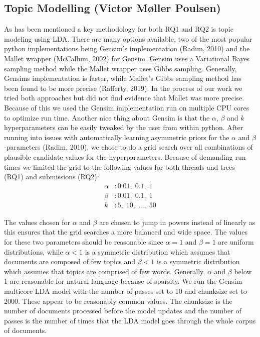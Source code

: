 \documentclass{article}
\begin{document}
    \subsection{Topic Modelling (Victor Møller Poulsen)}
    As has been mentioned a key methodology for both RQ1 and RQ2 is topic modeling using LDA. There are many options available, two of the most popular python implementations being Gensim’s implementation (Radim, 2010) and the Mallet wrapper (McCallum, 2002) for Gensim. Gensim uses a Variational Bayes sampling method while the Mallet wrapper uses Gibbs sampling. Generally, Gensims implementation is faster, while Mallet’s Gibbs sampling method has been found to be more precise (Rafferty, 2019). In the process of our work we tried both approaches but did not find evidence that Mallet was more precise. Because of this we used the Gensim implementation run on multiple CPU cores to optimize run time. 
Another nice thing about Gensim is that the $\alpha$, $\beta$ and $k$ hyperparameters can be easily tweaked by the user from within python. After running into issues with automatically learning asymmetric priors for the $\alpha$ and $\beta$-parameters (Radim, 2010), we chose to do a grid search over all combinations of plausible candidate values for the hyperparameters. Because of demanding run times we limited the grid to the following values for both threads and trees (RQ1) and submissions (RQ2): 
\begin{align*} 
    \alpha&: 0.01,\; 0.1,\; 1\\
    \beta&: 0.01, \; 0.1, \; 1 \\
    k&: 5, \; 10, \; \ldots,\; 50     
\end{align*}

The values chosen for $\alpha$ and $\beta$ are chosen to jump in powers instead of linearly as this ensures that the grid searches a more balanced and wide space. The values for these two parameters should be reasonable since $\alpha = 1$ and $\beta = 1$ are uniform distributions, while $\alpha < 1$ is a symmetric distribution which assumes that documents are composed of few topics and $\beta < 1$ is a symmetric distribution which assumes that topics are comprised of few words. Generally, $\alpha$ and $\beta$ below 1 are reasonable for natural language because of sparsity. 
We run the Gensim multicore LDA model with the number of passes set to 10 and chunksize set to 2000. These appear to be reasonably common values. The chunksize is the number of documents processed before the model updates and the number of passes is the number of times that the LDA model goes through the whole corpus of documents.
\end{document}
